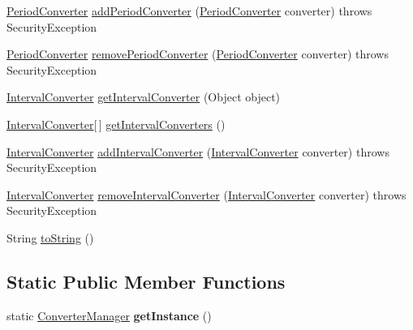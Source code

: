 \begin{DoxyCompactItemize}
\item 
\hyperlink{interfaceorg_1_1joda_1_1time_1_1convert_1_1_period_converter}{Period\-Converter} \hyperlink{classorg_1_1joda_1_1time_1_1convert_1_1_converter_manager_a36a50f0611c8fad72be7af32c3d61a8a}{add\-Period\-Converter} (\hyperlink{interfaceorg_1_1joda_1_1time_1_1convert_1_1_period_converter}{Period\-Converter} converter)  throws Security\-Exception 
\item 
\hyperlink{interfaceorg_1_1joda_1_1time_1_1convert_1_1_period_converter}{Period\-Converter} \hyperlink{classorg_1_1joda_1_1time_1_1convert_1_1_converter_manager_ab35f26eaedfe9e501fc68ef81638620d}{remove\-Period\-Converter} (\hyperlink{interfaceorg_1_1joda_1_1time_1_1convert_1_1_period_converter}{Period\-Converter} converter)  throws Security\-Exception 
\item 
\hyperlink{interfaceorg_1_1joda_1_1time_1_1convert_1_1_interval_converter}{Interval\-Converter} \hyperlink{classorg_1_1joda_1_1time_1_1convert_1_1_converter_manager_a4c13a99d0192d2d80cb7ee6b6987173a}{get\-Interval\-Converter} (Object object)
\item 
\hyperlink{interfaceorg_1_1joda_1_1time_1_1convert_1_1_interval_converter}{Interval\-Converter}\mbox{[}$\,$\mbox{]} \hyperlink{classorg_1_1joda_1_1time_1_1convert_1_1_converter_manager_a79819e8612ba868a3ffe97ed80154dd8}{get\-Interval\-Converters} ()
\item 
\hyperlink{interfaceorg_1_1joda_1_1time_1_1convert_1_1_interval_converter}{Interval\-Converter} \hyperlink{classorg_1_1joda_1_1time_1_1convert_1_1_converter_manager_ad6e4abad165f580d037a4349286c8d25}{add\-Interval\-Converter} (\hyperlink{interfaceorg_1_1joda_1_1time_1_1convert_1_1_interval_converter}{Interval\-Converter} converter)  throws Security\-Exception 
\item 
\hyperlink{interfaceorg_1_1joda_1_1time_1_1convert_1_1_interval_converter}{Interval\-Converter} \hyperlink{classorg_1_1joda_1_1time_1_1convert_1_1_converter_manager_a27d2aa5c7edefb35457036ed4134f4de}{remove\-Interval\-Converter} (\hyperlink{interfaceorg_1_1joda_1_1time_1_1convert_1_1_interval_converter}{Interval\-Converter} converter)  throws Security\-Exception 
\item 
String \hyperlink{classorg_1_1joda_1_1time_1_1convert_1_1_converter_manager_a3b372cb9b9589f70ac1da8f00f255153}{to\-String} ()
\end{DoxyCompactItemize}
\subsection*{Static Public Member Functions}
\begin{DoxyCompactItemize}
\item 
\hypertarget{classorg_1_1joda_1_1time_1_1convert_1_1_converter_manager_ab810d2651fddbab87f547341aeac3482}{static \hyperlink{classorg_1_1joda_1_1time_1_1convert_1_1_converter_manager}{Converter\-Manager} {\bfseries get\-Instance} ()}\label{classorg_1_1joda_1_1time_1_1convert_1_1_converter_manager_ab810d2651fddbab87f547341aeac3482}

\end{DoxyCompactItemize}
